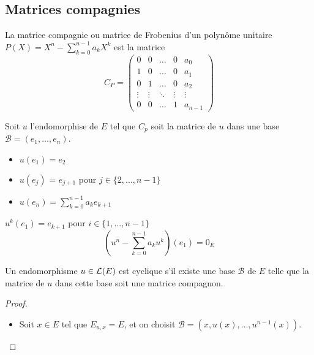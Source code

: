 \subsection{Matrices compagnies}



\begin{definition}
	La matrice compagnie ou matrice de Frobenius d'un polynôme unitaire $P(X)  = X^n - \sum_{k=0}^{n-1} a_k X^k$ est la matrice
	$$ C_P = \begin{pmatrix}
			0      & 0      & \ldots & 0      & a_0     \\
			1      & 0      & \ldots & 0      & a_1     \\
			0      & 1      & \ldots & 0      & a_2     \\
			\vdots & \vdots & \ddots & \vdots & \vdots  \\
			0      & 0      & \ldots & 1      & a_{n-1}
		\end{pmatrix}$$
\end{definition}

\begin{remarque}
	Soit $u$ l'endomorphise de $E$ tel que $C_p$ soit la matrice de $u$ dans une base $\mathcal{B} = (e_1, \ldots, e_n)$.
	\begin{itemize}
		\item $u(e_1) = e_2$
		\item $u(e_j)$ = $e_{j+1}$ pour $j \in \{2, \ldots, n-1\}$
		\item $u(e_n) = \sum_{k=0}^{n-1} a_k e_{k+1}$
	\end{itemize}


	$u^k(e_1) = e_{k+1}$ pour $i \in \{1, \ldots, n-1\}$
	$$ (u^n - \sum_{k=0}^{n-1} a_k u^k)(e_1) = 0_E$$
\end{remarque}

\begin{remarque}
	Un endomorphisme $u \in \mathcal{L}(E)$ est cyclique s'il existe une base $\mathcal{B}$ de $E$ telle que la matrice
	de $u$ dans cette base soit une matrice compagnon.
\end{remarque}

\begin{proof}
	\begin{itemize}
		\item Soit $x \in E$ tel que $E_{u,x} = E$, et on choisit $\mathcal{B} = (x, u(x), \dots, u^{n-1}(x))$.
	\end{itemize}
\end{proof}


